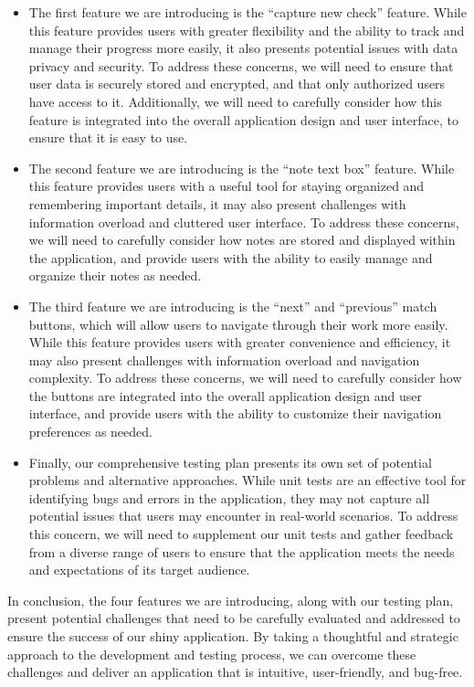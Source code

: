 \documentclass[11pt,]{article}
\providecommand{\tightlist}{%
  \setlength{\itemsep}{0pt}\setlength{\parskip}{0pt}}
\begin{document}
\begin{itemize}
\tightlist
\item
  The first feature we are introducing is the ``capture new check''
  feature. While this feature provides users with greater flexibility
  and the ability to track and manage their progress more easily, it
  also presents potential issues with data privacy and security. To
  address these concerns, we will need to ensure that user data is
  securely stored and encrypted, and that only authorized users have
  access to it. Additionally, we will need to carefully consider how
  this feature is integrated into the overall application design and
  user interface, to ensure that it is easy to use.
\item
  The second feature we are introducing is the ``note text box''
  feature. While this feature provides users with a useful tool for
  staying organized and remembering important details, it may also
  present challenges with information overload and cluttered user
  interface. To address these concerns, we will need to carefully
  consider how notes are stored and displayed within the application,
  and provide users with the ability to easily manage and organize their
  notes as needed.
\item
  The third feature we are introducing is the ``next'' and ``previous''
  match buttons, which will allow users to navigate through their work
  more easily. While this feature provides users with greater
  convenience and efficiency, it may also present challenges with
  information overload and navigation complexity. To address these
  concerns, we will need to carefully consider how the buttons are
  integrated into the overall application design and user interface, and
  provide users with the ability to customize their navigation
  preferences as needed.
\item
  Finally, our comprehensive testing plan presents its own set of
  potential problems and alternative approaches. While unit tests are an
  effective tool for identifying bugs and errors in the application,
  they may not capture all potential issues that users may encounter in
  real-world scenarios. To address this concern, we will need to
  supplement our unit tests and gather feedback from a diverse range of
  users to ensure that the application meets the needs and expectations
  of its target audience.
\end{itemize}

In conclusion, the four features we are introducing, along with our
testing plan, present potential challenges that need to be carefully
evaluated and addressed to ensure the success of our shiny application.
By taking a thoughtful and strategic approach to the development and
testing process, we can overcome these challenges and deliver an
application that is intuitive, user-friendly, and bug-free.
\end{document}
